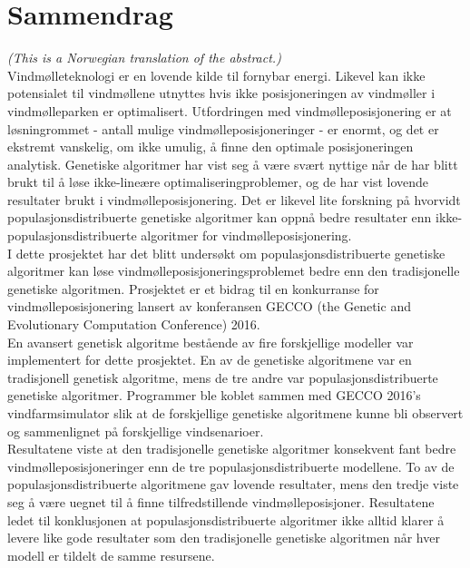 \section*{Sammendrag}

\noindent \textit{(This is a Norwegian translation of the abstract.)}\\

\noindent Vindmølleteknologi er en lovende kilde til fornybar energi. Likevel kan ikke potensialet til vindmøllene utnyttes hvis ikke posisjoneringen av vindmøller i vindmølleparken er optimalisert. Utfordringen med vindmølleposisjonering er at løsningrommet - antall mulige vindmølleposisjoneringer - er enormt, og det er ekstremt vanskelig, om ikke umulig, å finne den optimale posisjoneringen analytisk. Genetiske algoritmer har vist seg å være svært nyttige når de har blitt brukt til å løse ikke-lineære optimaliseringproblemer, og de har vist lovende resultater brukt i vindmølleposisjonering. Det er likevel lite forskning på hvorvidt populasjonsdistribuerte genetiske algoritmer kan oppnå bedre resultater enn ikke-populasjonsdistribuerte algoritmer for vindmølleposisjonering. \\

\noindent I dette prosjektet har det blitt undersøkt om populasjonsdistribuerte genetiske algoritmer kan løse vindmølleposisjoneringsproblemet bedre enn den tradisjonelle genetiske algoritmen. Prosjektet er et bidrag til en konkurranse for vindmølleposisjonering lansert av konferansen GECCO (the Genetic and Evolutionary Computation Conference) 2016.\\
    
\noindent En avansert genetisk algoritme bestående av fire forskjellige modeller var implementert for dette prosjektet. En av de genetiske algoritmene var en tradisjonell genetisk algoritme, mens de tre andre var populasjonsdistribuerte genetiske algoritmer. Programmer ble koblet sammen med GECCO 2016's vindfarmsimulator slik at de forskjellige genetiske algoritmene kunne bli observert og sammenlignet på forskjellige vindsenarioer.\\
    
\noindent Resultatene viste at den tradisjonelle genetiske algoritmer konsekvent fant bedre vindmølleposisjoneringer enn de tre populasjonsdistribuerte modellene. To av de populasjonsdistribuerte algoritmene gav lovende resultater, mens den tredje viste seg å være uegnet til å finne tilfredstillende vindmølleposisjoner. Resultatene ledet til konklusjonen at populasjonsdistribuerte algoritmer ikke alltid klarer å levere like gode resultater som den tradisjonelle genetiske algoritmen når hver modell er tildelt de samme resursene.\\